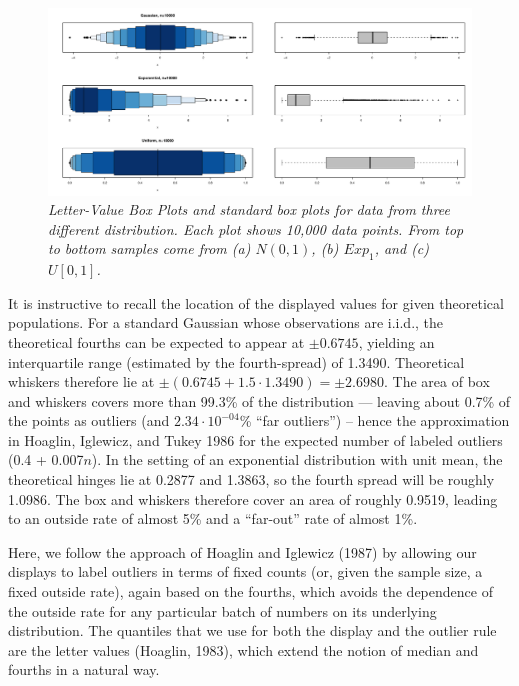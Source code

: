 \documentclass[11pt]{article}
\begin{document}
\begin{figure}[hbt]
\begin{center}
\includegraphics[width=6in]{boxplots.pdf}
\caption{\it \label{stackbox} Letter-Value Box Plots and standard 
box plots for data from three different distribution.  Each plot 
shows 10,000 data points.  From top to bottom samples come from 
(a) $N(0,1)$, (b) $Exp_1$, and (c) $U[0,1]$. }
\end{center}
\end{figure}


It is instructive to recall the location of the displayed
values for given theoretical populations.
For a standard Gaussian whose observations are i.i.d.,
the theoretical fourths can be expected to appear at 
$\pm  0.6745$, yielding an interquartile range 
(estimated by the fourth-spread) of 1.3490.
Theoretical whiskers therefore lie at 
$\pm (0.6745 + 1.5 \cdot 1.3490) = \pm 2.6980$.  
The area of box and whiskers covers more than 99.3\% of the 
distribution --- leaving about 0.7\% of the points as outliers 
(and $2.34 \cdot 10^{-04}$\% ``far outliers'') -- hence the
approximation in Hoaglin, Iglewicz, and Tukey 1986 for the
expected number of labeled outliers (0.4 + 0.007$n$).
In the setting of an exponential distribution with unit mean, 
the theoretical hinges lie at 0.2877 and 1.3863, so the fourth
spread will be roughly 1.0986.  The box and whiskers therefore
cover an area of roughly 0.9519, leading to an outside rate
of almost 5\% and a ``far-out'' rate of almost 1\%.

Here, we follow the approach of Hoaglin and Iglewicz (1987)
by allowing our displays to label outliers in terms
of fixed counts (or, given the sample size, a fixed outside rate),
again based on the fourths, which avoids the dependence of the
outside rate for any particular batch of numbers on its
underlying distribution.
The quantiles that we use for both the display and the outlier
rule are the letter values (Hoaglin, 1983), which extend the
notion of median and fourths in a natural way.
\end{document}
